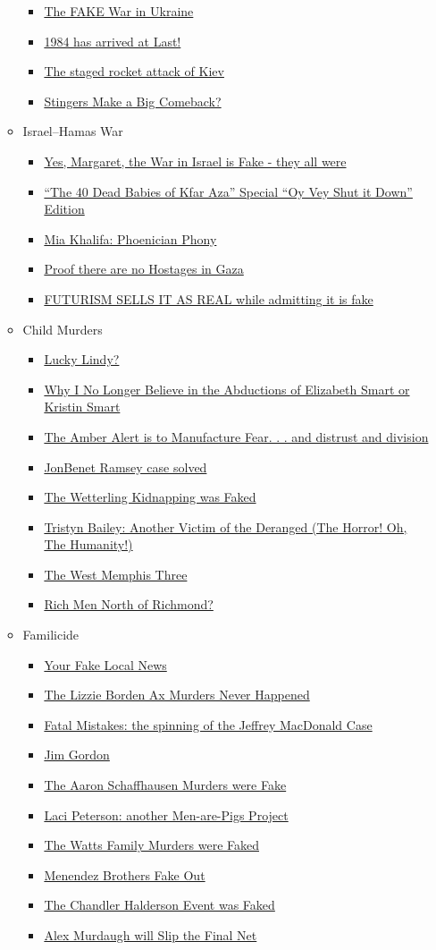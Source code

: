 \documentclass{article}
\newcommand{\insertmydocument}[2]{ %
  \item \href{http://www.mileswmathis.com/#2}{#1}
}
\begin{document}
\begin{itemize}
\begin{itemize}
\begin{itemize}
      \insertmydocument{The FAKE War in Ukraine}{minime2.pdf}
      \insertmydocument{1984 has arrived at Last!}{adams2.pdf}
      \insertmydocument{The staged rocket attack of Kiev}{kiev.pdf}
      \insertmydocument{Stingers Make a Big Comeback?}{sting.pdf}

    \end{itemize}

    \item Israel–Hamas War
    \begin{itemize}

      \insertmydocument{Yes, Margaret, the War in Israel is Fake - they all were}{isra.pdf}
      \insertmydocument{“The 40 Dead Babies of Kfar Aza” Special “Oy Vey Shut it Down” Edition}{40babies.pdf}
      \insertmydocument{Mia Khalifa: Phoenician Phony}{khalifa.pdf}
      \insertmydocument{Proof there are no Hostages in Gaza}{naft.pdf}
      \insertmydocument{FUTURISM SELLS IT AS REAL while admitting it is fake}{ai2.pdf}

    \end{itemize}

    \item Child Murders
    \begin{itemize}

      \insertmydocument{Lucky Lindy?}{lindy.pdf}
      \insertmydocument{Why I No Longer Believe in the Abductions of Elizabeth Smart or Kristin Smart}{smart.pdf}
      \insertmydocument{The Amber Alert is to Manufacture Fear. . . and distrust and division}{amber.pdf}
      \insertmydocument{JonBenet Ramsey case solved}{jonbenet.pdf}
      \insertmydocument{The Wetterling Kidnapping was Faked}{wett.pdf}
      \insertmydocument{Tristyn Bailey: Another Victim of the Deranged (The Horror! Oh, The Humanity!)}{tristyn.pdf}
      \insertmydocument{The West Memphis Three}{echols.pdf}
      \insertmydocument{Rich Men North of Richmond?}{oliver.pdf}

    \end{itemize}

    \item Familicide
    \begin{itemize}

      \insertmydocument{Your Fake Local News}{hovey.pdf}
      \insertmydocument{The Lizzie Borden Ax Murders Never Happened}{lizzie.pdf}
      \insertmydocument{Fatal Mistakes: the spinning of the Jeffrey MacDonald Case}{fatal.pdf}
      \insertmydocument{Jim Gordon}{gordon.pdf}
      \insertmydocument{The Aaron Schaffhausen Murders were Fake}{schaff.pdf}
      \insertmydocument{Laci Peterson: another Men-are-Pigs Project}{laci.pdf}
      \insertmydocument{The Watts Family Murders were Faked}{watts.pdf}
      \insertmydocument{Menendez Brothers Fake Out}{lyle.pdf}
      \insertmydocument{The Chandler Halderson Event was Faked}{halderson.pdf}
      \insertmydocument{Alex Murdaugh will Slip the Final Net}{murdaugh.pdf}
    \end{itemize}


\end{itemize}
\end{itemize}
\end{document}
